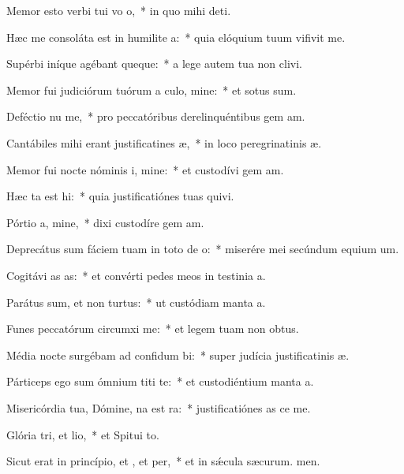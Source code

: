 \item Memor esto verbi tui vo o,~* in quo mihi  deti.
\item Hæc me consoláta est in humilite a:~* quia elóquium tuum vifivit me.
\item Supérbi iníque agébant queque:~* a lege autem tua non clivi.
\item Memor fui judiciórum tuórum a culo, mine:~* et sotus sum.
\item Deféctio nu me,~* pro peccatóribus derelinquéntibus gem am.
\item Cantábiles mihi erant justificatines æ,~* in loco peregrinatinis æ.
\item Memor fui nocte nóminis i, mine:~* et custodívi gem am.
\item Hæc ta est hi:~* quia justificatiónes tuas quivi.
\item Pórtio a, mine,~* dixi custodíre gem am.
\item Deprecátus sum fáciem tuam in toto de o:~* miserére mei secúndum equium um.
\item Cogitávi as as:~* et convérti pedes meos in testinia a.
\item Parátus sum, et non  turtus:~* ut custódiam manta a.
\item Funes peccatórum circumxi  me:~* et legem tuam non  obtus.
\item Média nocte surgébam ad confidum bi:~* super judícia justificatinis æ.
\item Párticeps ego sum ómnium titi te:~* et custodiéntium manta a.
\item Misericórdia tua, Dómine, na est ra:~* justificatiónes as ce me.
\item Glória tri, et lio,~* et Spitui to.
\item Sicut erat in princípio, et , et per,~* et in sǽcula sæcurum. men.
